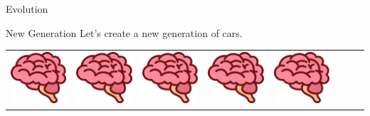 \documentclass{do}
\begin{document}
\begin{frame}{Evolution}
    \begin{block}{New Generation}
        \small{Let’s create a new generation of cars.}
        \hfill
        \begin{tabular}{c|c|c|c|c|c|c|c}
            \includegraphics[scale=0.66]{brain0.png}&
            \includegraphics[scale=0.66]{brain0.png}&
            \includegraphics[scale=0.66]{brain0.png}&
            \includegraphics[scale=0.66]{brain0.png}&
            \includegraphics[scale=0.66]{brain0.png}&

\end{tabular}
\end{block}
\end{frame}
\end{document}
